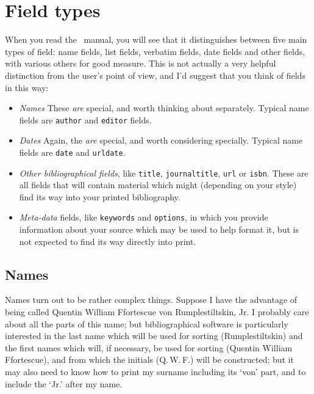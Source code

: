 \section{Field types}

When you read the \biblatex\ manual,
you will see that it distinguishes between five main types of field:
name fields, list fields, verbatim fields, date fields and other
fields, with various others for good measure. This is not actually a
very helpful distinction from the user's point of view, and I'd
suggest that you think of fields in this way:
\begin{itemize}
\item \emph{Names} These \emph{are} special, and worth thinking about
  separately. Typical name fields are \texttt{author} and
  \texttt{editor} fields.
\item \emph{Dates} Again, the \emph{are} special, and worth
  considering specially. Typical name fields are \texttt{date} and
  \texttt{urldate}.
\item \emph{Other bibliographical fields}, like \texttt{title},
  \texttt{journaltitle}, \texttt{url} or \texttt{isbn}. These are all
  fields that will contain material which might (depending on your
  style) find its way into your printed bibliography.
\item \emph{Meta-data} fields, like \texttt{keywords} and
  \texttt{options}, in which you provide information about your source
  which may be used to help format it, but is not expected to find its
  way directly into print.
\end{itemize} 

\subsection{Names}

Names turn out to be rather complex things. Suppose I have the
advantage of being called Quentin William Ffortescue von
Rumplestiltskin, Jr. I probably care about all the parts of this name;
but bibliographical software is particularly interested in the last
name which will be used for sorting (Rumplestiltskin) and the first
names which will, if necessary, be used for sorting (Quentin William
Ffortescue), and from which the initials (Q.\,W.\,F.) will be
constructed; but it may also need to know how to print my surname
including its `von' part, and to include the `Jr.' after my name.

